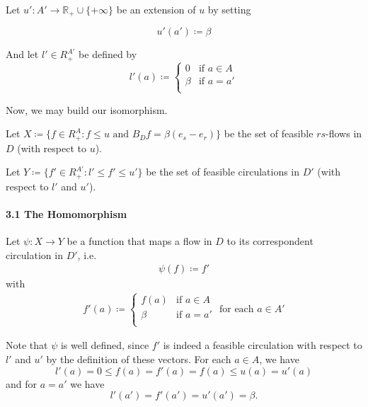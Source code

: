 \documentclass[a4paper,10pt, leqno]{article}
\theoremstyle{definition}
\begin{document}
Let $u' : A' \to \mathbb{R}_+ \cup \{+\infty\}$ be an extension of $u$ by setting 

\begin{equation}
    \tag{3.2} u'(a') \coloneqq \beta
\end{equation}

And let $l' \in R_+^{A'}$ be defined by 
$$l'(a) \coloneqq
\left\{
	\begin{array}{ll}
		0  & \mbox{if } a \in A \\
		\beta & \mbox{if } a = a' \\
	\end{array}
\right.$$

Now, we may build our isomorphism.

Let $X \coloneqq \{ f \in R_+^A : f \leq u \text{ and } B_Df = \beta(e_s - e_r)\}$ be the set of feasible $rs$-flows in $D$ (with respect to $u$).

Let $Y \coloneqq \{ f' \in R_+^{A'} : l' \leq f' \leq u'\}$ be the set of feasible circulations in $D'$ (with respect to $l'$ and $u'$).

\paragraph{3.1 The Homomorphism} Let $\psi : X \to Y$ be a function that maps a flow in $D$ to its correspondent circulation in $D'$, i.e.
\begin{align*}
    \tag{3.3} \psi(f) \coloneqq f'
\end{align*}
with
\begin{align*}
    \tag{3.4}
    f'(a) \coloneqq 
    \left\{
        \begin{array}{ll}
            f(a)  & \mbox{if } a \in A \\
            \beta & \mbox{if } a = a' \\
        \end{array}
    \right. \text{ for each } a \in A'
\end{align*}

Note that $\psi$ is well defined, since $f'$ is indeed a feasible circulation with respect to $l'$ and $u'$ by the definition of these vectors. For each $a \in A$,  we have 
$$l'(a) = 0 \leq f(a) = f'(a) = f(a) \leq u(a) = u'(a)$$
and for $a = a'$ we have 
$$l'(a') = f'(a') = u'(a') = \beta.$$
\end{document}
